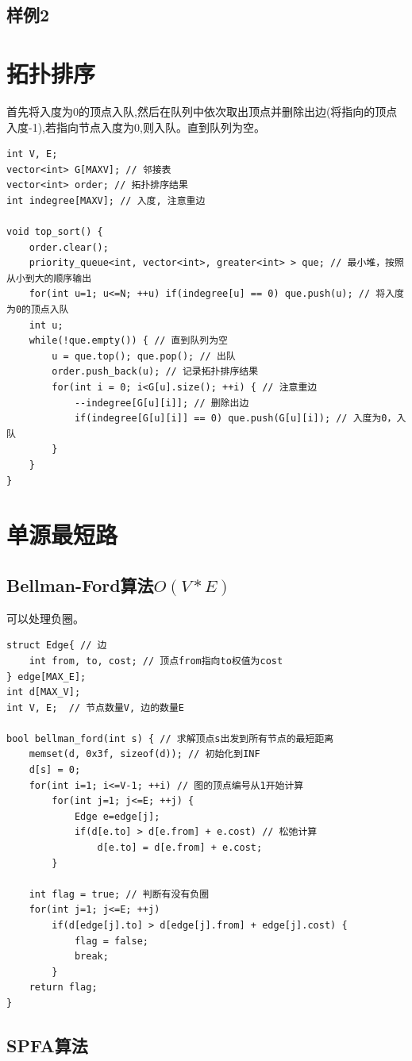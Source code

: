 \documentclass[a4paper]{ctexrep}
\begin{document}
\subsection{样例2}
\section{拓扑排序}
首先将入度为0的顶点入队,然后在队列中依次取出顶点并删除出边(将指向的顶点入度-1),若指向节点入度为0,则入队。直到队列为空。

\begin{lstlisting}
int V, E;
vector<int> G[MAXV]; // 邻接表
vector<int> order; // 拓扑排序结果
int indegree[MAXV]; // 入度, 注意重边

void top_sort() {
	order.clear();
	priority_queue<int, vector<int>, greater<int> > que; // 最小堆，按照从小到大的顺序输出
	for(int u=1; u<=N; ++u) if(indegree[u] == 0) que.push(u); // 将入度为0的顶点入队
	int u;
	while(!que.empty()) { // 直到队列为空
		u = que.top(); que.pop(); // 出队
		order.push_back(u); // 记录拓扑排序结果
		for(int i = 0; i<G[u].size(); ++i) { // 注意重边
			--indegree[G[u][i]]; // 删除出边
			if(indegree[G[u][i]] == 0) que.push(G[u][i]); // 入度为0，入队
		}
	}
}
\end{lstlisting}

\section{单源最短路}
\subsection{Bellman-Ford算法$O(V*E)$}
可以处理负圈。

\begin{lstlisting}
struct Edge{ // 边
	int from, to, cost; // 顶点from指向to权值为cost
} edge[MAX_E];
int d[MAX_V];
int V, E;  // 节点数量V, 边的数量E

bool bellman_ford(int s) { // 求解顶点s出发到所有节点的最短距离
	memset(d, 0x3f, sizeof(d)); // 初始化到INF
	d[s] = 0;
	for(int i=1; i<=V-1; ++i) // 图的顶点编号从1开始计算
		for(int j=1; j<=E; ++j) {
			Edge e=edge[j];
			if(d[e.to] > d[e.from] + e.cost) // 松弛计算
				d[e.to] = d[e.from] + e.cost;
		}

	int flag = true; // 判断有没有负圈
	for(int j=1; j<=E; ++j)
		if(d[edge[j].to] > d[edge[j].from] + edge[j].cost) {
			flag = false;
			break;
		}
	return flag;
}
\end{lstlisting}
\subsection{SPFA算法}
\end{document}
